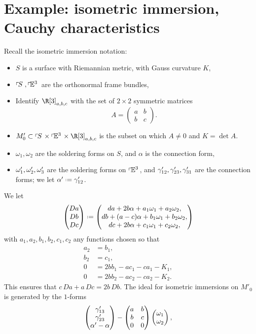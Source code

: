 \section{Example: isometric immersion, Cauchy characteristics}
Recall the isometric immersion notation: 
\begin{itemize}
\item
\(S\) is a surface with Riemannian metric, with Gauss curvature \(K\),
\item
\(\left\ulcorner\!S\right.,\left\ulcorner\!\mathbb{E}^{3}\right.\) are the orthonormal frame bundles,
\item
Identify \(\R[3]_{a,b,c}\) with the set of \(2 \times 2\) symmetric matrices
\[
A=
\begin{pmatrix}
a&b\\
b&c
\end{pmatrix}.
\]
\item
\(M_0'\subset \frameBundle{S} \times \frameBundleE{3} \times \R[3]_{a,b,c}\) is the subset on which \(A\ne 0\) and \(K=\det A\).
\item
\(\omega_1,\omega_2\) are the soldering forms on \(S\), and \(\alpha\) is the connection form,
\item
\(\omega'_1,\omega'_2,\omega'_3\) are the soldering forms on \(\left\ulcorner\!\mathbb{E}^{3}\right.\), and \(\gamma'_{12},\gamma'_{23},\gamma'_{31}\) are the connection forms; we let \(\otalpha\defeq\qc_{12}\).
\end{itemize}
We let
\[
\begin{pmatrix}
Da \\
Db \\
Dc
\end{pmatrix}
\defeq 
\begin{pmatrix}
da + 2b\alpha + a_1 \pf_1 + a_2 \pf_2, \\
db + (a-c)\alpha + b_1 \pf_1 + b_2 \pf_2, \\
dc + 2b \alpha  + c_1 \pf_1 + c_2 \pf_2,
\end{pmatrix}
\]
with \(a_1,a_2,b_1,b_2,c_1,c_2\) any functions chosen so that
\begin{align*}
a_2 &= b_1, \\
b_2 &= c_1, \\
0 &= 2bb_1-ac_1-ca_1-K_1, \\
0 &= 2bb_2-ac_2-ca_2-K_2.
\end{align*}
This ensures that \(c \, Da + a \, Dc = 2b \, Db\).
The ideal for isometric immersions on \(M'_0\) is generated by the \(1\)-forms
\[
\begin{pmatrix}
\gamma'_{13} \\
\gamma'_{23} \\
\alpha'-\alpha
\end{pmatrix}
-
\begin{pmatrix}
a & b \\
b & c \\
0 & 0 
\end{pmatrix}
\begin{pmatrix}
\omega_1 \\
\omega_2
\end{pmatrix},
\]
